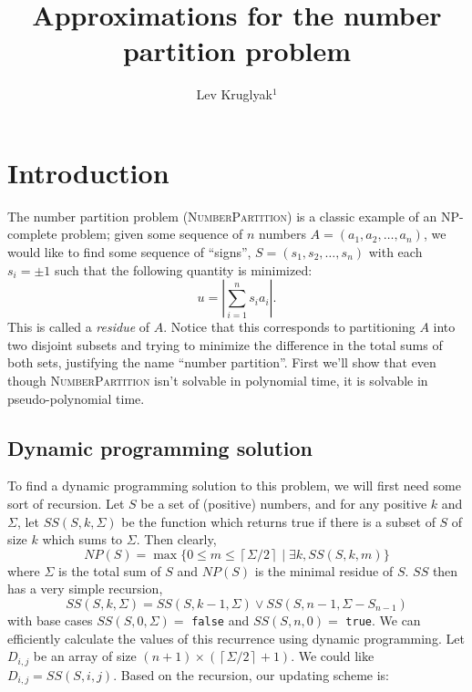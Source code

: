 \documentclass[a4paper, 10pt, twocolumn, twoside]{article}
\begin{document}
\linespread{0.5}

\title{Approximations for the number partition problem}

\author{Lev Kruglyak$^1$}

\def\O{\mathop{\smash{O}}\nolimits}
\def\o{\mathop{\smash{o}}\nolimits}


\maketitle 
\thispagestyle{fancy} 
\pagestyle{fancy}

\section{Introduction}
\label{sec:Introduction}

The number partition problem (\textsc{NumberPartition}) is a classic example of an NP-complete problem; given some sequence of $n$ numbers $A=(a_1, a_2,\ldots, a_n)$, we would like to find some sequence of ``signs'', $S=(s_1,s_2,\ldots, s_n)$ with each $s_i=\pm 1$ such that the following quantity is minimized:
\[
    u = \left|\sum^n_{i=1} s_i a_i\right|
.\] 
This is called a \emph{residue} of $A$. Notice that this corresponds to partitioning $A$ into two disjoint subsets and trying to minimize the difference in the total sums of both sets, justifying the name ``number partition''. First we'll show that even though \textsc{NumberPartition} isn't solvable in polynomial time, it is solvable in pseudo-polynomial time.

\subsection{Dynamic programming solution}

To find a dynamic programming solution to this problem, we will first need some sort of recursion. Let $S$ be a set of (positive) numbers, and for any positive $k$ and  $\Sigma$, let $SS(S, k, \Sigma)$ be the function which returns true if there is a subset of $S$ of size $k$ which sums to $\Sigma$. Then clearly,
\[
    NP(S) = \max \{0\leq m \leq \left\lceil \Sigma / 2\right\rceil\mid \exists k, SS(S,k,m)\}
\] 
where $\Sigma$ is the total sum of $S$ and $NP(S)$ is the minimal residue of $S$. $SS$ then has a very simple recursion,
\[
    SS(S, k, \Sigma) = SS(S, k-1, \Sigma) \vee SS(S, n-1, \Sigma - S_{n-1})
\] 
with base cases $SS(S,0, \Sigma)=$ \verb|false| and $SS(S,n,0)=$ \verb|true|. We can efficiently calculate the values of this recurrence using dynamic programming. Let $D_{i,j}$ be an array of size $(n+1)\times (\left\lceil \Sigma / 2\right\rceil+1)$. We could like $D_{i,j}=SS(S, i, j)$. Based on the recursion, our updating scheme is:
\end{document}

